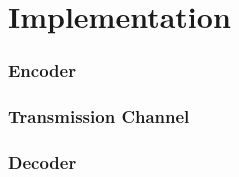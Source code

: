 \documentclass[Main]{subfiles}
\begin{document}
\chapter{Implementation}

\subsection{Encoder}

\subsection{Transmission Channel}

\subsection{Decoder}

\end{document}
